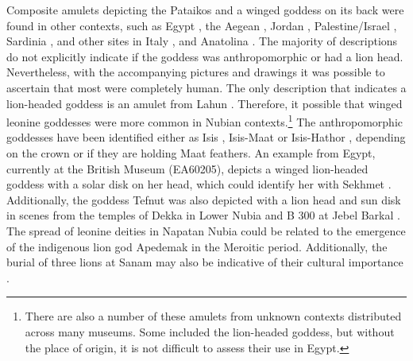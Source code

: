 Composite amulets depicting the Pataikos and a winged goddess on its back were found in other contexts, such as Egypt \parencites[p.~105-106, KatNr. 516]{herrmannÄgyptischenAmuletteSammlungen2003}[p.~52-53]{massonScarabsScaraboidsAmulets2015}[p.~26]{petrieIllahunKahunGurob1891}, the Aegean \parencite{apostolaMultipleConnotationsPataikos2019}, Jordan \parencite{boschloosLandFarAway2021}, Palestine/Israel \parencites[p.~465-467, KatNr. 642, 644]{herrmannÄgyptischeAmuletteAus1994}[p.~36-38, 139-141 KatNr. 16, 17, 116]{herrmannÄgyptischeAmuletteAus2002}[p.~133-134, 136-137, KatNr. 170, 171, 172, 173, 176, 178]{herrmannÄgyptischeAmuletteAus2006}[p.~153, KatNr. 299]{herrmannÄgyptischeAmuletteAus2016}, Sardinia \parencite[Taf. 15:2]{hölblÄgyptischesKulturgutIm1986}, and other sites in Italy \parencite[Kat. Nr. 16, 19, 18, 20, 22, 290-327, 398, 405, 409, 410, 468, 469, 509, 748-749]{hölblBeziehungenÄgyptischenKultur1979}, and Anatolina \parencite[p.~42-43, Kat.-Nr.9, Farbtafel I.2]{hölblAegyptiacaAusMina2017}. The majority of descriptions do not explicitly indicate if the goddess was anthropomorphic or had a lion head. Nevertheless, with the accompanying pictures and drawings it was possible to ascertain that most were completely human. The only description that indicates a lion-headed goddess is an amulet from Lahun \parencite[p.~26]{petrieIllahunKahunGurob1891}. Therefore, it possible that winged leonine goddesses were more common in Nubian contexts.\footnote{There are also a number of these amulets from unknown contexts distributed across many museums. Some included the lion-headed goddess, but without the place of origin, it is not difficult to assess their use in Egypt.} The anthropomorphic goddesses have been identified either as Isis \parencite[p.~149]{minas-nerpelPtahPataikosHarpokratesKhepri2013}, Isis-Maat \parencites{matzkerGruppierungPatäkenAnhand1990}[p.~19-20]{györyPataikosHawksShoulders2003}[p.~52]{massonScarabsScaraboidsAmulets2015} or Isis-Hathor \parencites[p.~114-115]{hölblBeziehungenÄgyptischenKultur1979}[p.~140]{herrmannÄgyptischeAmuletteAus2002}, depending on the crown or if they are holding Maat feathers. An example from Egypt, currently at the British Museum (EA60205), depicts a winged lion-headed goddess with a solar disk on her head, which could identify her with Sekhmet \parencite[p.~86, pl. 14.1b]{dasenDwarfsAncientEgypt1993}. Additionally, the goddess Tefnut was also depicted with a lion head and sun disk in scenes from the temples of Dekka in Lower Nubia and B 300 at Jebel Barkal \parencites[p.~34]{lohwasserGötterweltImReich1997}{hassanel-weshahyScenesGoddessTefnut2022}. The spread of leonine deities in Napatan Nubia could be related to the emergence of the indigenous lion god Apedemak in the Meroitic period. Additionally, the burial of three lions at Sanam may also be indicative of their cultural importance \parencite[p.~55]{lohwasserAspekteNapatanischenGesellschaft2012}.


